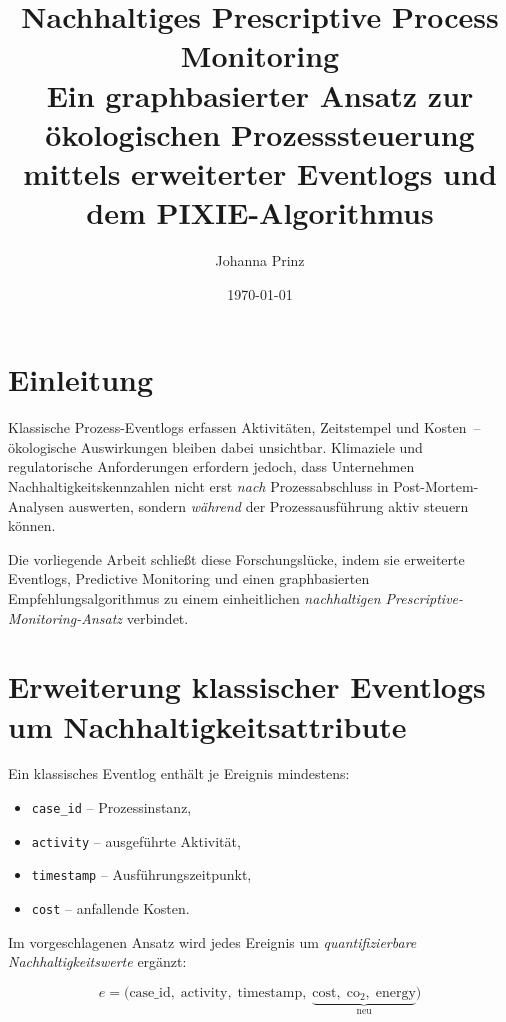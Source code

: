 \documentclass[12pt, a4paper]{article}
\title{%
  \textbf{Nachhaltiges Prescriptive Process Monitoring}\\[0.4em]
  \large Ein graphbasierter Ansatz zur ökologischen Prozesssteuerung
  mittels erweiterter Eventlogs und dem PIXIE-Algorithmus
}
\author{Johanna Prinz}
\date{\today}
\begin{document}
\maketitle
\tableofcontents
\newpage

\section{Einleitung}
\label{sec:einleitung}

Klassische Prozess-Eventlogs erfassen Aktivitäten, Zeitstempel und Kosten~--
ökologische Auswirkungen bleiben dabei unsichtbar.
Klimaziele und regulatorische Anforderungen erfordern jedoch,
dass Unternehmen Nachhaltigkeitskennzahlen nicht erst \emph{nach}
Prozessabschluss in Post-Mortem-Analysen auswerten,
sondern \emph{während} der Prozessausführung aktiv steuern können.

Die vorliegende Arbeit schließt diese Forschungslücke,
indem sie erweiterte Eventlogs, Predictive Monitoring
und einen graphbasierten Empfehlungsalgorithmus zu einem
einheitlichen \emph{nachhaltigen Prescriptive-Monitoring-Ansatz} verbindet.

\section{Erweiterung klassischer Eventlogs um Nachhaltigkeitsattribute}
\label{sec:eventlog}

Ein klassisches Eventlog enthält je Ereignis mindestens:
\begin{itemize}
  \item \texttt{case\_id} -- Prozessinstanz,
  \item \texttt{activity} -- ausgeführte Aktivität,
  \item \texttt{timestamp} -- Ausführungszeitpunkt,
  \item \texttt{cost} -- anfallende Kosten.
\end{itemize}

Im vorgeschlagenen Ansatz wird jedes Ereignis um
\emph{quantifizierbare Nachhaltigkeitswerte} ergänzt:

\begin{equation}
  e = \bigl(\text{case\_id},\;\text{activity},\;\text{timestamp},\;
            \underbrace{\text{cost},\;\text{co}_2,\;\text{energy}}_{\text{neu}}\bigr)
\end{equation}
\end{document}
